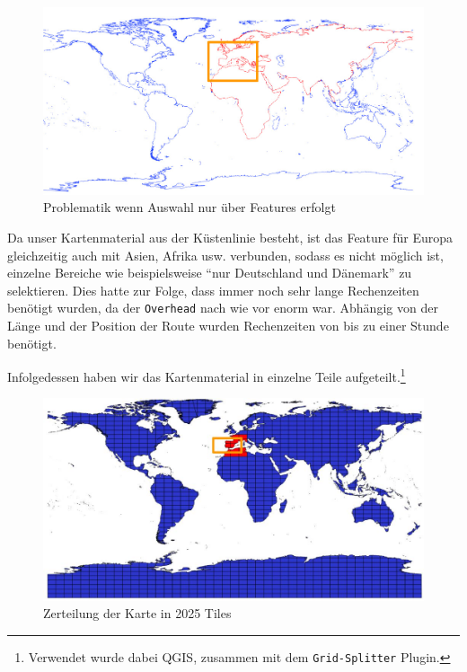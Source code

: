\documentclass[letterpaper]{article}
\begin{document}
	\begin{figure}[!htbp]
		\centering
		\includegraphics[width=\linewidth]{select_features_problem}
		\caption{Problematik wenn Auswahl nur über Features erfolgt}
		\label{fig:select_features_problem}
	\end{figure}

	Da unser Kartenmaterial aus der Küstenlinie besteht, ist das Feature für Europa gleichzeitig auch mit Asien, Afrika usw. verbunden, sodass es nicht möglich ist, einzelne Bereiche wie beispielsweise "`nur Deutschland und Dänemark"' zu selektieren. Dies hatte zur Folge, dass immer noch sehr lange Rechenzeiten benötigt wurden, da der \texttt{Overhead} nach wie vor enorm war. Abhängig von der Länge und der Position der Route wurden Rechenzeiten von bis zu einer Stunde benötigt.

	Infolgedessen haben wir das Kartenmaterial in einzelne Teile aufgeteilt.\footnote{Verwendet wurde dabei QGIS\cite{qgis}, zusammen mit dem \texttt{Grid-Splitter} Plugin.}

	\begin{figure}[!htb]
		\centering
		\includegraphics[width=\linewidth]{grid_splitter}
		\caption{Zerteilung der Karte in 2025 Tiles}
		\label{fig:grid_splitter}
	\end{figure}
\end{document}
